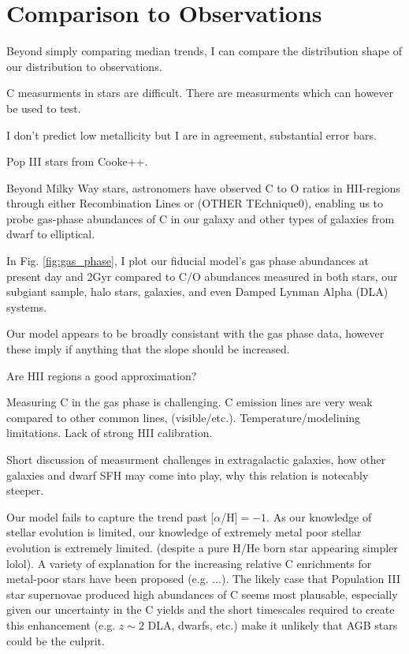 \documentclass[12pt,oneside]{report}
\begin{document}
\section{Comparison to Observations}\label{sec:gas}


Beyond simply comparing median trends, I can compare the distribution 
shape of our distribution to observations. 

C measurments in stars are difficult. There are measurments which can however be used to test. 

I don't predict low metallicity but I are in agreement, substantial error bars.

Pop III stars from Cooke++. 

Beyond Milky Way stars, astronomers have observed C to O ratios in
HII-regions through either Recombination Lines or (OTHER TEchnique0), enabling
us to probe gas-phase abundances of C in our galaxy and other types of
galaxies from dwarf to elliptical. 

In Fig. \ref{fig:gas_phase}, I plot our fiducial model's gas phase abundances
at present day and 2Gyr compared to C/O
abundances measured in both stars, our subgiant sample, halo stars, galaxies,
and even Damped Lynman Alpha (DLA) systems. 

Our model appears to be broadly consistant with the gas phase data, however these imply if anything that the slope should be increased. 

Are HII regions a good approximation?

Measuring C in the gas phase is challenging. C emission lines are
very weak compared to other common lines, (visible/etc.).
Temperature/modelining limitations. Lack of strong HII calibration. 

Short discussion of measurment challenges in extragalactic galaxies, how other galaxies and dwarf SFH may come into play, why this relation is notecably steeper.

Our model fails to capture the trend past [$\alpha$/H]$=-1$. As our knowledge
of stellar evolution is limited, our knowledge of extremely metal poor stellar
evolution is extremely limited. (despite a pure H/He born star appearing
simpler lolol). A variety of explanation for the increasing relative C
enrichments for metal-poor stars have been proposed (e.g. ...). The likely case
that Population III star supernovae produced high abundances of C seems
most plausable, especially given our uncertainty in the C yields and the
short timescales required to create this enhancement (e.g. $z\sim 2$ DLA,
dwarfs, etc.) make it unlikely that AGB stars could be the culprit. 
\end{document}
